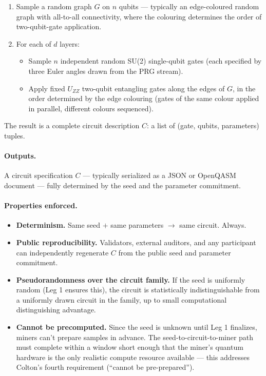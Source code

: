 \documentclass[11pt]{article}
\begin{document}
\begin{enumerate}
    \item Sample a random graph $G$ on $n$ qubits --- typically an edge-coloured random graph with all-to-all connectivity, where the colouring determines the order of two-qubit-gate application.
    \item For each of $d$ layers:
        \begin{itemize}
            \item Sample $n$ independent random SU(2) single-qubit gates (each specified by three Euler angles drawn from the PRG stream).
            \item Apply fixed $U_{ZZ}$ two-qubit entangling gates along the edges of $G$, in the order determined by the edge colouring (gates of the same colour applied in parallel, different colours sequenced).
        \end{itemize}
\end{enumerate}

The result is a complete circuit description $C$: a list of (gate, qubits, parameters) tuples.

\paragraph{Outputs.} A circuit specification $C$ --- typically serialized as a JSON or OpenQASM document --- fully determined by the seed and the parameter commitment.

\paragraph{Properties enforced.}
\begin{itemize}
    \item \textbf{Determinism.} Same seed $+$ same parameters $\to$ same circuit. Always.
    \item \textbf{Public reproducibility.} Validators, external auditors, and any participant can independently regenerate $C$ from the public seed and parameter commitment.
    \item \textbf{Pseudorandomness over the circuit family.} If the seed is uniformly random (Leg 1 ensures this), the circuit is statistically indistinguishable from a uniformly drawn circuit in the family, up to small computational distinguishing advantage.
    \item \textbf{Cannot be precomputed.} Since the seed is unknown until Leg 1 finalizes, miners can't prepare samples in advance. The seed-to-circuit-to-miner path must complete within a window short enough that the miner's quantum hardware is the only realistic compute resource available --- this addresses Colton's fourth requirement (``cannot be pre-prepared'').
\end{itemize}
\end{document}
